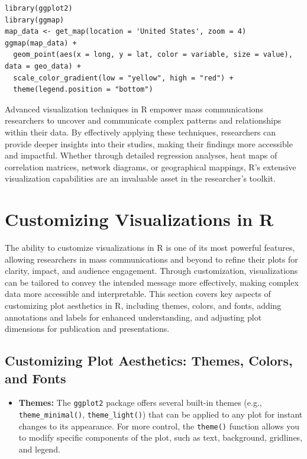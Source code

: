 \documentclass[
]{book}
\providecommand{\tightlist}{%
  \setlength{\itemsep}{0pt}\setlength{\parskip}{0pt}}
\begin{document}
\begin{verbatim}
library(ggplot2)
library(ggmap)
map_data <- get_map(location = 'United States', zoom = 4)
ggmap(map_data) + 
  geom_point(aes(x = long, y = lat, color = variable, size = value), data = geo_data) +
  scale_color_gradient(low = "yellow", high = "red") +
  theme(legend.position = "bottom")
\end{verbatim}

Advanced visualization techniques in R empower mass communications researchers to uncover and communicate complex patterns and relationships within their data. By effectively applying these techniques, researchers can provide deeper insights into their studies, making their findings more accessible and impactful. Whether through detailed regression analyses, heat maps of correlation matrices, network diagrams, or geographical mappings, R's extensive visualization capabilities are an invaluable asset in the researcher's toolkit.

\section{Customizing Visualizations in R}\label{customizing-visualizations-in-r}

The ability to customize visualizations in R is one of its most powerful features, allowing researchers in mass communications and beyond to refine their plots for clarity, impact, and audience engagement. Through customization, visualizations can be tailored to convey the intended message more effectively, making complex data more accessible and interpretable. This section covers key aspects of customizing plot aesthetics in R, including themes, colors, and fonts, adding annotations and labels for enhanced understanding, and adjusting plot dimensions for publication and presentations.

\subsection{Customizing Plot Aesthetics: Themes, Colors, and Fonts}\label{customizing-plot-aesthetics-themes-colors-and-fonts}

\begin{itemize}
\tightlist
\item
  \textbf{Themes:} The \texttt{ggplot2} package offers several built-in themes (e.g., \texttt{theme\_minimal()}, \texttt{theme\_light()}) that can be applied to any plot for instant changes to its appearance. For more control, the \texttt{theme()} function allows you to modify specific components of the plot, such as text, background, gridlines, and legend.
\end{itemize}
\end{document}

